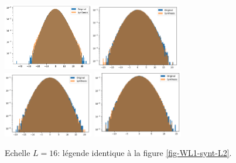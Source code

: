 \documentclass[12pt,twoside]{article}
\begin{document}
\begin{figure}
\centering
\includegraphics[width=0.35\textwidth]{fig-WL1-synt-L16-pixelval.png}\includegraphics[width=0.35\textwidth]{fig-WL1-synt-L16-details_1.png}\\
\includegraphics[width=0.35\textwidth]{fig-WL1-synt-L16-details_2.png}
\includegraphics[width=0.35\textwidth]{fig-WL1-synt-L16-details_3.png}
\caption{Echelle $L=16$: légende identique à la figure \ref{fig-WL1-synt-L2}.}
\label{fig-WL1-synt-L16}
\end{figure}
\end{document}
